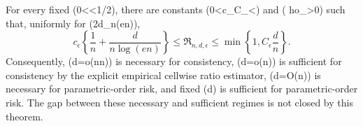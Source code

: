 For every fixed (0<\epsilon<1/2), there are constants (0<c_\epsilon\leq C_\epsilon<\infty) and (
ho_\epsilon>0) such that, uniformly for (2\leq d\leq\rho_\epsilon n\log(en)),
\[
 c_\epsilon\left\{\frac1n+\frac{d}{n\log(en)}\right\}
 \leq \mathfrak R_{n,d,\epsilon}
 \leq \min\left\{1,C_\epsilon\frac d n\right\}.
\]
Consequently, (d=o(n\log n)) is necessary for consistency, (d=o(n)) is sufficient for consistency by the explicit empirical cellwise ratio estimator, (d=O(\log n)) is necessary for parametric-order risk, and fixed (d) is sufficient for parametric-order risk.  The gap between these necessary and sufficient regimes is not closed by this theorem.